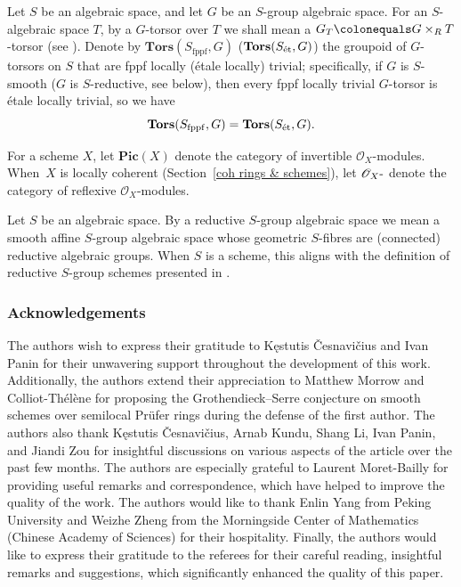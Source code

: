 \documentclass[JEP,XML,SOM,Unicode,published]{cedram}
\newcommand{\NoChangel}[1]{%
\expandafter\let\csname old\string#1\endcsname=#1
\let#1=\relax
\newcommand{#1}{\mathop{\mathcode`l="716C\csname old\string#1\endcsname\mathcode`l="7160}\nolimits}%
}
\newcommand{\Rflx}{\mathbf{Rflx}}\NoChangel{\Rflx}
\newcommand{\sO}{\mathscr{O}}
\let\ce\colonequals
\let\x\text
\newcommand{\fppf}{\mathrm{fppf}}
\newcommand{\et}{\textup{ét}}
\theoremstyle{plain}
\theoremstyle{definition}
\begin{document}
Let $S$ be an algebraic space, and let $G$ be an $S$-group algebraic space. For an $S$-algebraic space $T$, by a $G$-torsor over $T$ we shall mean a $G_T\ce G\times_RT$-torsor (see ). Denote by $\textbf{Tors}(S_{\fppf},G)$ (\resp $\textbf{Tors}(S_{\et},G)$) the groupoid of $G$-torsors on $S$ that are fppf locally (\resp étale locally) trivial; specifically, if $G$ is $S$-smooth (\eg $G$ is $S$-reductive, see below), then every fppf locally trivial $G$-torsor is étale locally trivial, so we have
\[
\textbf{Tors}(S_{\fppf},G)= \textbf{Tors}(S_{\et},G).
\]

For a scheme $X$, let $\mathbf{Pic}(X)$ denote the category of invertible $\sO_X$\nobreakdash-mod\-ules. When~$X$ is locally coherent (Section~\ref{coh rings & schemes}), let $\sO_X\x{-}\Rflx$ denote the category of reflexive $\sO_X$\nobreakdash-mod\-ules.

Let $S$ be an algebraic space. By a reductive $S$-group algebraic space we mean a smooth affine $S$-group algebraic space whose geometric $S$-fibres are (connected) reductive algebraic groups. When $S$ is a scheme, this aligns with the definition of reductive $S$-group schemes presented in \cite{SGA3IIInew}.

\subsubsection*{Acknowledgements}
The authors wish to express their gratitude to K\k{e}stutis \v{C}esnavi\v{c}ius and Ivan Panin for their unwavering support throughout the development of this work.
Additionally, the authors extend their appreciation to Matthew Morrow and Colliot-Thélène for proposing the Grothendieck--Serre conjecture on smooth schemes over semilocal Prüfer rings during the defense of the first author.
The authors also thank K\k{e}stutis \v{C}esnavi\v{c}ius, Arnab Kundu, Shang Li, Ivan Panin, and Jiandi Zou for insightful discussions on various aspects of the article over the past few months.
The authors are especially grateful to Laurent Moret-Bailly for providing useful remarks and correspondence, which have helped to improve the quality of the work.
The authors would like to thank Enlin Yang from Peking University and Weizhe Zheng from the Morningside Center of Mathematics (Chinese Academy of Sciences) for their hospitality.
Finally, the authors would like to express their gratitude to the referees for their careful reading, insightful remarks and suggestions, which significantly enhanced the quality of this paper.
\end{document}
